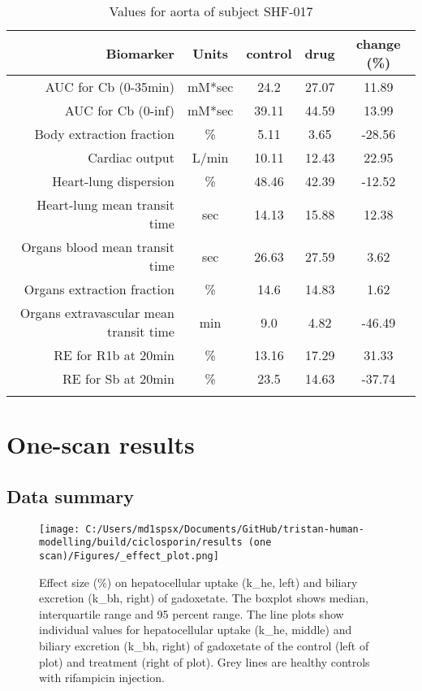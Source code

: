\documentclass{epflreport}%
\begin{document}
\begin{longtable}{rcccc}%
\hline%
Biomarker&Units&control&drug&change (\%)\\%
\hline%
AUC for Cb (0{-}35min)&mM*sec&24.2&27.07&11.89\\%
AUC for Cb (0{-}inf)&mM*sec&39.11&44.59&13.99\\%
Body extraction fraction&\%&5.11&3.65&{-}28.56\\%
Cardiac output&L/min&10.11&12.43&22.95\\%
Heart{-}lung dispersion&\%&48.46&42.39&{-}12.52\\%
Heart{-}lung mean transit time&sec&14.13&15.88&12.38\\%
Organs blood mean transit time&sec&26.63&27.59&3.62\\%
Organs extraction fraction&\%&14.6&14.83&1.62\\%
Organs extravascular mean transit time&min&9.0&4.82&{-}46.49\\%
RE for R1b at 20min&\%&13.16&17.29&31.33\\%
RE for Sb at 20min&\%&23.5&14.63&{-}37.74\\%
\hline%
\caption{Values for aorta of subject SHF-017} \\%
\end{longtable}%
\clearpage%
\chapter{One{-}scan results}%
\section{Data summary}%
\label{sec:Datasummary}%

%


\begin{figure}[h!]%
\centering%
\texttt{[image: C:/Users/md1spsx/Documents/GitHub/tristan-human-modelling/build/ciclosporin/results (one scan)/Figures/\_effect\_plot.png]}%
\caption{Effect size (\%) on hepatocellular uptake (k\_he, left) and biliary excretion (k\_bh, right) of gadoxetate. The boxplot shows median, interquartile range and 95 percent range. The line plots show individual values for hepatocellular uptake (k\_he, middle) and biliary excretion (k\_bh, right) of gadoxetate of the control (left of plot) and treatment (right of plot). Grey lines are healthy controls with rifampicin injection.}%
\end{figure}
\end{document}
